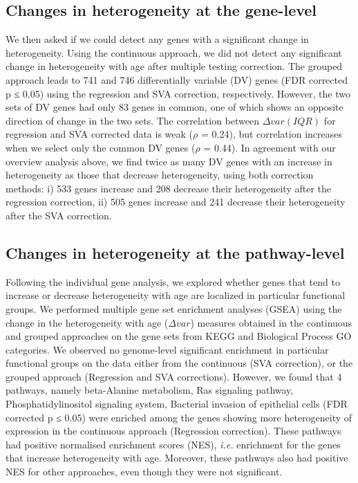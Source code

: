 \documentclass[12pt,twoside]{unicam}
\begin{document}
\hypertarget{changes-in-heterogeneity-at-the-gene-level}{%
\subsection{Changes in heterogeneity at the gene-level}\label{changes-in-heterogeneity-at-the-gene-level}}

We then asked if we could detect any genes with a significant change in heterogeneity. Using the continuous approach, we did not detect any significant change in heterogeneity with age after multiple testing correction. The grouped approach leads to 741 and 746 differentially variable (DV) genes (FDR corrected p ≤ 0.05) using the regression and SVA correction, respectively. However, the two sets of DV genes had only 83 genes in common, one of which shows an opposite direction of change in the two sets. The correlation between \(\Delta var(IQR)\) for regression and SVA corrected data is weak (\(\rho\) = 0.24), but correlation increases when we select only the common DV genes (\(\rho\) = 0.44). In agreement with our overview analysis above, we find twice as many DV genes with an increase in heterogeneity as those that decrease heterogeneity, using both correction methods: i) 533 genes increase and 208 decrease their heterogeneity after the regression correction, ii) 505 genes increase and 241 decrease their heterogeneity after the SVA correction.

\hypertarget{changes-in-heterogeneity-at-the-pathway-level}{%
\subsection{Changes in heterogeneity at the pathway-level}\label{changes-in-heterogeneity-at-the-pathway-level}}

Following the individual gene analysis, we explored whether genes that tend to increase or decrease heterogeneity with age are localized in particular functional groups. We performed multiple gene set enrichment analyses (GSEA) using the change in the heterogeneity with age (\(\Delta var\)) measures obtained in the continuous and grouped approaches on the gene sets from KEGG and Biological Process GO categories. We observed no genome-level significant enrichment in particular functional groups on the data either from the continuous (SVA correction), or the grouped approach (Regression and SVA corrections). However, we found that 4 pathways, namely beta-Alanine metabolism, Ras signaling pathway, Phosphatidylinositol signaling system, Bacterial invasion of epithelial cells (FDR corrected p ≤ 0.05) were enriched among the genes showing more heterogeneity of expression in the continuous approach (Regression correction). These pathways had positive normalised enrichment scores (NES), \emph{i.e.} enrichment for the genes that increase heterogeneity with age. Moreover, these pathways also had positive NES for other approaches, even though they were not significant.
\end{document}
